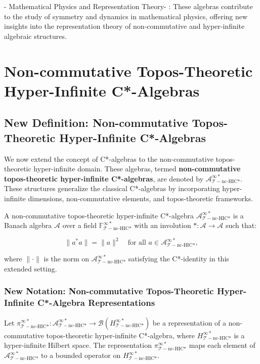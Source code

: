 \documentclass{article}
\begin{document}
-  Mathematical Physics and Representation Theory- : These algebras contribute to the study of symmetry and dynamics in mathematical physics, offering new insights into the representation theory of non-commutative and hyper-infinite algebraic structures.



\section{Non-commutative Topos-Theoretic Hyper-Infinite C*-Algebras}
\subsection{New Definition: Non-commutative Topos-Theoretic Hyper-Infinite C*-Algebras}
We now extend the concept of C*-algebras to the non-commutative topos-theoretic hyper-infinite domain. These algebras, termed \textbf{non-commutative topos-theoretic hyper-infinite C*-algebras}, are denoted by \(\mathcal{A}_{\mathcal{T}-\text{nc-HIC*}}^{\infty *}\). These structures generalize the classical C*-algebras by incorporating hyper-infinite dimensions, non-commutative elements, and topos-theoretic frameworks.

A non-commutative topos-theoretic hyper-infinite C*-algebra \(\mathcal{A}_{\mathcal{T}-\text{nc-HIC*}}^{\infty *}\) is a Banach algebra \(\mathcal{A}\) over a field \(\mathbb{F}_{\mathcal{T}-\text{nc-HIC*}}^{\infty *}\) with an involution \( *: \mathcal{A} \to \mathcal{A} \) such that:

\[
\|a^* a\| = \|a\|^2 \quad \text{for all } a \in \mathcal{A}_{\mathcal{T}-\text{nc-HIC*}}^{\infty *},
\]

where \(\| \cdot \|\) is the norm on \(\mathcal{A}_{\mathcal{T}-\text{nc-HIC*}}^{\infty *}\) satisfying the C*-identity in this extended setting.

\subsubsection{New Notation: Non-commutative Topos-Theoretic Hyper-Infinite C*-Algebra Representations}
Let \(\pi_{\mathcal{T}-\text{nc-HIC*}}^{\infty *}: \mathcal{A}_{\mathcal{T}-\text{nc-HIC*}}^{\infty *} \to \mathcal{B}(H_{\mathcal{T}-\text{nc-HIC*}}^{\infty *})\) be a representation of a non-commutative topos-theoretic hyper-infinite C*-algebra, where \(H_{\mathcal{T}-\text{nc-HIC*}}^{\infty *}\) is a hyper-infinite Hilbert space. The representation \(\pi_{\mathcal{T}-\text{nc-HIC*}}^{\infty *}\) maps each element of \(\mathcal{A}_{\mathcal{T}-\text{nc-HIC*}}^{\infty *}\) to a bounded operator on \(H_{\mathcal{T}-\text{nc-HIC*}}^{\infty *}\).
\end{document}

